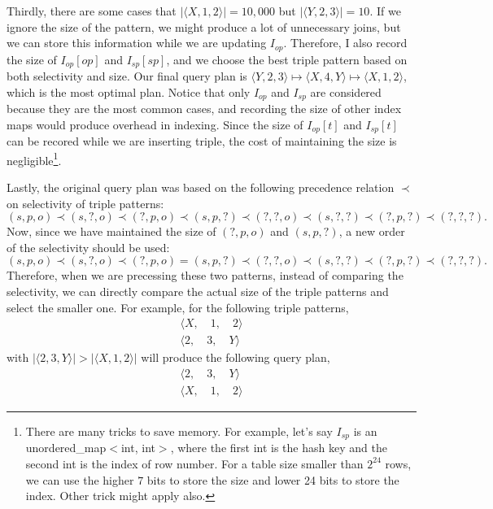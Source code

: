 \documentclass{article}
\begin{document}
\begin{enumerate}
\begin{enumerate}
Thirdly, there are some cases that $|\langle X, 1, 2\rangle| = 10,000$ but $|\langle Y, 2, 3\rangle| = 10$. If we ignore the size of the pattern, we might produce a lot of unnecessary joins, but we can store this information while we are updating $I_{op}$. Therefore, I also record the size of $I_{op}[op]$ and $I_{sp}[sp]$, and we choose the best triple pattern based on both selectivity and size. Our final query plan is $\langle Y, 2, 3\rangle \mapsto \langle X, 4, Y\rangle \mapsto \langle X, 1, 2\rangle$, which is the most optimal plan. Notice that only $I_{op}$ and $I_{sp}$ are considered because they are the most common cases, and recording the size of other index maps would produce overhead in indexing. Since the size of $I_{op}[t]$ and $I_{sp}[t]$ can be recored while we are inserting triple, the cost of maintaining the size is negligible\footnote{There are many tricks to save memory. For example, let's say $I_{sp}$ is an unordered\_map$<$int, int$>$, where the first int is the hash key and the second int is the index of row number. For a table size smaller than $2^{24}$ rows, we can use the higher $7$ bits to store the size and lower 24 bits to store the index. Other trick might apply also.}. 

Lastly, the original query plan was based on the following precedence relation $\prec$ on selectivity of triple patterns: 
\begin{equation*}
	(s, p, o) \prec (s, ?, o) \prec (?, p, o) \prec (s, p, ?) \prec (?, ?, o) \prec (s, ?, ?) \prec (?, p, ?) \prec (?, ?, ?).
\end{equation*}
Now, since we have maintained the size of $(?, p, o)$ and $(s, p, ?)$, a new order of the selectivity should be used:
\begin{equation*}
	(s, p, o) \prec (s, ?, o) \prec (?, p, o) = (s, p, ?) \prec (?, ?, o) \prec (s, ?, ?) \prec (?, p, ?) \prec (?, ?, ?).
\end{equation*}
Therefore, when we are precessing these two patterns, instead of comparing the selectivity, we can directly compare the actual size of the triple patterns and select the smaller one. For example, for the following triple patterns,
\begin{align*}
	\langle X,\quad 1,\quad 2\rangle \\
	\langle 2,\quad 3,\quad Y\rangle
\end{align*}
with $|\langle 2, 3, Y\rangle| > |\langle X, 1, 2\rangle|$ will produce the following query plan,
\begin{align*}
	\langle 2,\quad 3,\quad Y\rangle\\
	\langle X,\quad 1,\quad 2\rangle
\end{align*}


\end{enumerate}
\end{enumerate}
\end{document}
